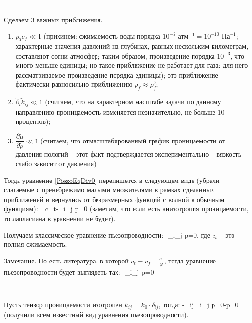 \documentclass[main.tex]{subfiles}
\begin{document}
--------------------------------------------------------------------

Сделаем 3 важных приближения:
\begin{enumerate}
	\item $p_0 c_f\ll 1$ (прикинем: сжимаемость воды порядка $10^{-5}\text{ атм}^{-1}=10^{-10}\text{ Па}^{-1}$; характерные значения давлений на глубинах, равных нескольким километрам, составляют сотни атмосфер; таким образом, произведение порядка $10^{-3}$, что много меньше единицы; но такое приближение не работает для газа: для него рассматриваемое произведение порядка единицы); это приближение фактически равносильно приближению $\rho_f\approx\rho_f^0$;
	\item $\tilde{\partial}_i\tilde{k}_{ij}\ll 1$ (считаем, что на характерном масштабе задачи по данному направлению проницаемость изменяется незначительно, не больше 10 процентов);
	\item $\dfrac{\partial\tilde{\mu}}{\partial\tilde{p}}\ll 1$ (считаем, что отмасштабированный график проницаемости от давления пологий -- этот факт подтверждается экспериментально -- вязкость слабо зависит от давления)
\end{enumerate}

Тогда уравнение \eqref{PiezoEqDiv0} перепишется в следующем виде (убрали слагаемые с пренебрежимо малыми множителями в рамках сделанных приближений и вернулись от безразмерных функций с волной к обычным функциям):
\beq
{}_{c_t}-\partial_i\partial_j p=0
\eeq
(заметим, что если есть анизотропия проницаемости, то лапласиана в уравнении не будет).

Получаем классическое уравнение пьезопроводности:
\beq
{}-\partial_i\partial_j p=0,
\eeq
где $c_t$ -- это полная сжимаемость.

Замечание. Но есть литература, в которой $c_t=c_f+\frac{c_\text{п}}{\varphi}$, тогда уравнение пьезопроводности будет выглядеть так:
\beq
{}-\partial_i\partial_j p=0
\eeq

--------------------------------------------------------------------

Пусть тензор проницаемости изотропен $k_{ij}=k_0\cdot\delta_{ij}$, тогда:
\beq
{}-\delta_{ij}\,\partial_i\partial_j p=0\Leftrightarrow{}-\Delta p=0
\eeq
(получили всем известный вид уравнения пьезопроводности).
\end{document}
